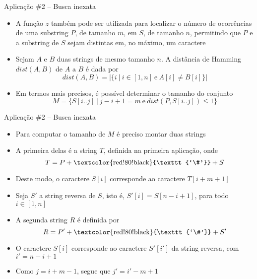 \begin{frame}[fragile]{Aplicação \#2 -- Busca inexata}

    \begin{itemize}
        \item A função $z$ também pode ser utilizada para localizar o número de ocorrências
            de uma substring $P$, de tamanho $m$, em $S$, de tamanho $n$, permitindo que $P$
            e a substring de $S$ sejam distintas em, no máximo, um caractere

        \item Sejam $A$ e $B$ duas strings de mesmo tamanho $n$. A distância de Hamming $dist(A, B)$
            de $A$ a $B$ é dada por
        \[
            dist(A, B) = | \lbrace i\ | \ i\in [1,n]\ \mbox{e}\ A[i] \neq B[i]\rbrace |
        \]
       
        \item Em termos mais precisos, é possível determinar o tamanho do conjunto
        \[
            M = \lbrace S[i..j]\ | \ j - i + 1 = m\ \mbox{e}\ dist(P, S[i..j])\leq 1\rbrace
        \]
            
    \end{itemize}

\end{frame}

\begin{frame}[fragile]{Aplicação \#2 -- Busca inexata}

    \begin{itemize}
        \item Para computar o tamanho de $M$ é preciso montar duas strings

        \item A primeira delas é a string $T$, definida na primeira aplicação, onde
         \[
            T = P + \mbox{\textcolor{red!80!black}{\texttt{`\#'}}} + S
        \]

        \item Deste modo, o caractere $S[i]$ corresponde ao caractere $T[i + m + 1]$

        \item Seja $S'$ a string reversa de $S$, isto é, $S'[i] = S[n - i + 1]$, para todo
            $i\in [1,n]$

        \item A segunda string $R$ é definida por
         \[
            R = P' + \mbox{\textcolor{red!80!black}{\texttt{`\#'}}} + S'
        \]

        \item O caractere $S[i]$ corresponde ao caractere $S'[i']$ da string 
            reversa, com $i' = n - i + 1$

        \item Como $j = i + m - 1$, segue que $j' = i' - m + 1$ 

    \end{itemize}

\end{frame}

